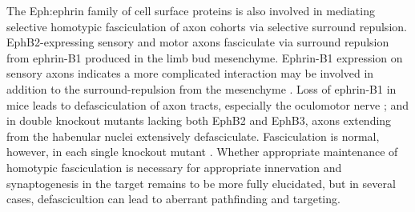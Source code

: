 The Eph:ephrin family of cell surface proteins is also involved in mediating selective homotypic fasciculation of axon cohorts via selective surround repulsion.
EphB2-expressing sensory and motor axons fasciculate via surround repulsion from ephrin-B1 produced in the limb bud mesenchyme.
Ephrin-B1 expression on sensory axons indicates a more complicated interaction may be involved in addition to the surround-repulsion from the mesenchyme \cite{luxey2013eph}.
Loss of ephrin-B1 in mice leads to defasciculation of axon tracts, especially the oculomotor nerve \cite{davy2004ephrin}; and in double knockout mutants lacking both EphB2 and EphB3, axons extending from the habenular nuclei extensively defasciculate.
Fasciculation is normal, however, in each single knockout mutant \cite{orioli1996sek4}.
Whether appropriate maintenance of homotypic fasciculation is necessary for appropriate innervation and synaptogenesis in the target remains to be more fully elucidated, but in several cases, defascicultion can lead to aberrant pathfinding and targeting.